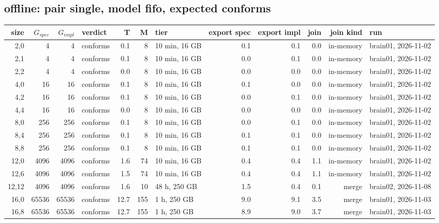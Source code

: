 \documentclass[10pt]{article}
\begin{document}
\subsection*{offline: pair \textsf{single}, model fifo, expected conforms}
\begin{longtable}{@{}rrrlrrlrrrrl@{}}
\toprule
size & $G_{\mathit{spec}}$ & $G_{\mathit{impl}}$ & verdict & T & M & tier & export spec & export impl & join & join kind & run \\
\midrule
\endhead
\color{red} 2,0 & 4 & 4 & conforms & 0.1 & 8 & 10 min, 16 GB & 0.1 & 0.1 & 0.0 & in-memory & brain01, 2026-11-02 \\
\color{red} 2,1 & 4 & 4 & conforms & 0.1 & 8 & 10 min, 16 GB & 0.0 & 0.1 & 0.0 & in-memory & brain01, 2026-11-02 \\
\color{red} 2,2 & 4 & 4 & conforms & 0.0 & 8 & 10 min, 16 GB & 0.0 & 0.0 & 0.0 & in-memory & brain01, 2026-11-02 \\
\color{red} 4,0 & 16 & 16 & conforms & 0.1 & 8 & 10 min, 16 GB & 0.1 & 0.0 & 0.0 & in-memory & brain01, 2026-11-02 \\
\color{red} 4,2 & 16 & 16 & conforms & 0.1 & 8 & 10 min, 16 GB & 0.0 & 0.1 & 0.0 & in-memory & brain01, 2026-11-02 \\
\color{red} 4,4 & 16 & 16 & conforms & 0.0 & 8 & 10 min, 16 GB & 0.0 & 0.0 & 0.0 & in-memory & brain01, 2026-11-02 \\
\color{red} 8,0 & 256 & 256 & conforms & 0.1 & 8 & 10 min, 16 GB & 0.0 & 0.1 & 0.0 & in-memory & brain01, 2026-11-02 \\
\color{red} 8,4 & 256 & 256 & conforms & 0.1 & 8 & 10 min, 16 GB & 0.1 & 0.1 & 0.0 & in-memory & brain01, 2026-11-02 \\
\color{red} 8,8 & 256 & 256 & conforms & 0.1 & 8 & 10 min, 16 GB & 0.1 & 0.1 & 0.0 & in-memory & brain01, 2026-11-02 \\
\color{red} 12,0 & 4096 & 4096 & conforms & 1.6 & 74 & 10 min, 16 GB & 0.4 & 0.4 & 1.1 & in-memory & brain01, 2026-11-02 \\
\color{red} 12,6 & 4096 & 4096 & conforms & 1.5 & 74 & 10 min, 16 GB & 0.4 & 0.4 & 1.1 & in-memory & brain01, 2026-11-02 \\
\color{blue} 12,12 & 4096 & 4096 & conforms & 1.6 & 10 & 48 h, 250 GB & 1.5 & 0.4 & 0.1 & merge & brain02, 2026-11-08 \\
\color{blue} 16,0 & 65536 & 65536 & conforms & 12.7 & 155 & 1 h, 250 GB & 9.0 & 9.1 & 3.5 & merge & brain01, 2026-11-03 \\
\color{blue} 16,8 & 65536 & 65536 & conforms & 12.7 & 155 & 1 h, 250 GB & 8.9 & 9.0 & 3.7 & merge & brain01, 2026-11-03 \\

\end{longtable}
\end{document}
